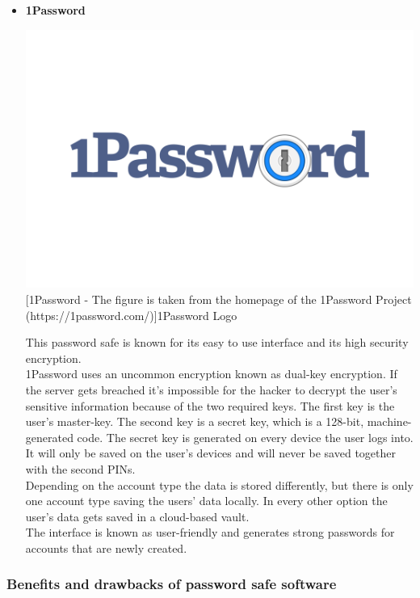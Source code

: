 \documentclass[conference]{IEEEtran}
\begin{document}
\begin{itemize}
    \item \textbf{1Password} \\
        \begin{center}
            \includegraphics[scale=0.06]{./images/1Password-Logo.wine.png}
            [1Password - The figure is taken from the homepage of the 1Password Project (https://1password.com/)]{1Password Logo}
        \end{center}
        This password safe is known for its easy to use interface and its high security encryption. \\
        1Password uses an uncommon encryption known as dual-key encryption. If the server gets breached it's impossible for the hacker to decrypt the user's sensitive information because of the two required keys. The first key is the user's master-key. The second key is a secret key, which is a 128-bit, machine-generated code. The secret key is generated on every device the user logs into. It will only be saved on the user's devices and will never be saved together with the second PINs.\\
        Depending on the account type the data is stored differently, but there is only one account type saving the users' data locally. In every other option the user's data gets saved in a cloud-based vault.\\
        The interface is known as user-friendly and generates strong passwords for accounts that are newly created.
        \cite{b7}
\end{itemize}


\subsubsection{Benefits and drawbacks of password safe software}
\end{document}
